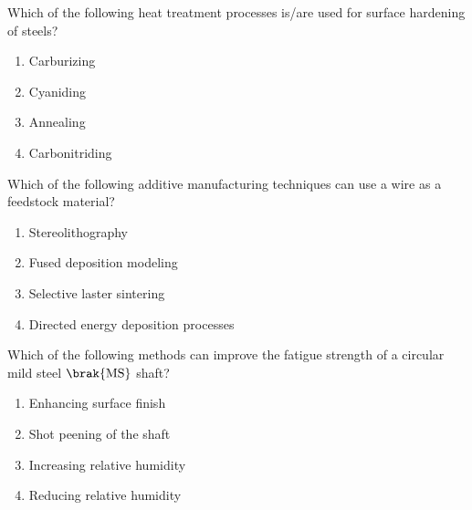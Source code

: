 \iffalse
	\title{2022-ME-27-39}
	\author{EE24Btech11006 - Arnav Mahishi}
	\section{me}
	\chapter{2022}
\fi
\item{
Which of the following heat treatment processes is/are used for surface hardening of steels?
\begin{multicols}{4}
\begin{enumerate}
\item Carburizing
\item Cyaniding
\item Annealing 
\item Carbonitriding
\end{enumerate}
\end{multicols}
}
\item{
Which of the following additive manufacturing techniques can use a wire as a feedstock material?
\begin{multicols}{2}
\begin{enumerate}
\item Stereolithography
\item Fused deposition modeling
\item Selective laster sintering
\item Directed energy deposition processes
\end{enumerate}
\end{multicols}}
\item{
Which of the following methods can improve the fatigue strength of a circular mild steel $\brak{\text{MS}}$ shaft?
\begin{multicols}{4}
\begin{enumerate}
\item Enhancing surface finish
\item Shot peening of the shaft
\item Increasing relative humidity
\item Reducing relative humidity
\end{enumerate}
\end{multicols}
}
